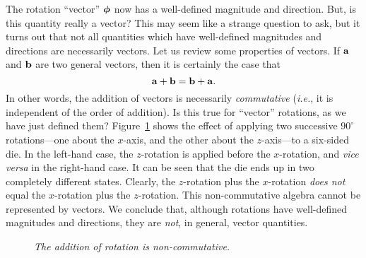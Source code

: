 The  rotation ``vector'' $\mbox{\boldmath$\phi$}$  now has a well-defined magnitude and
 direction. But, is this quantity really a vector? 
This may seem like a strange question to ask, but it turns out that not all
quantities which have well-defined magnitudes and directions are necessarily
vectors. Let us review some properties of vectors. If ${\bf a}$ and ${\bf b}$
are two general vectors, then it is certainly the case that
\begin{equation}
{\bf a} + {\bf b} = {\bf b} + {\bf a}.
\end{equation}
In other words, the addition of vectors is necessarily {\em commutative} ({\em i.e.}, it is
independent of the order of addition). Is this true for ``vector'' rotations, as we have 
just defined them?
Figure~\ref{f70}  shows the effect of applying two successive $90^\circ$ rotations---one about the $x$-axis, and the other about the $z$-axis---to a six-sided die. In the
left-hand case, the $z$-rotation is applied before the $x$-rotation, and {\em vice
versa} in the right-hand case. It can be seen that the die ends up in two completely
different states. Clearly, the $z$-rotation plus the
$x$-rotation {\em does not} equal
the  $x$-rotation plus the $z$-rotation. This non-commutative algebra cannot be
represented by vectors. We conclude that, although rotations have  well-defined magnitudes and
directions, they are {\em not}, in general, vector quantities. 

\begin{figure}
\epsfysize=4in
\centerline{}
\caption{\em The addition of rotation is non-commutative.}\label{f70}
\end{figure}


